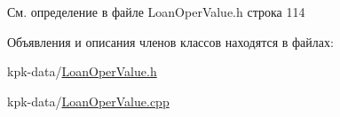 См. определение в файле Loan\+Oper\+Value.\+h строка 114



Объявления и описания членов классов находятся в файлах\+:\begin{DoxyCompactItemize}
\item 
kpk-\/data/\hyperlink{_loan_oper_value_8h}{Loan\+Oper\+Value.\+h}\item 
kpk-\/data/\hyperlink{_loan_oper_value_8cpp}{Loan\+Oper\+Value.\+cpp}\end{DoxyCompactItemize}

